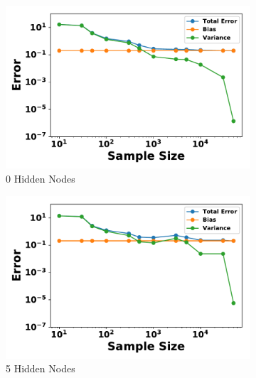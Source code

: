 \documentclass[letterpaper]{article} %
\begin{document}
        \begin{figure}[p]
          \centering
          \begin{subfigure}[b]{0.245\textwidth}
              \centering
              \includegraphics[width=\textwidth]{./RBM_Error_vs_Samples_HiddenNodes0-eps-converted-to.pdf}
              \caption{0 Hidden Nodes}
          \end{subfigure}
          \begin{subfigure}[b]{0.245\textwidth}
              \centering
              \includegraphics[width=\textwidth]{./RBM_Error_vs_Samples_HiddenNodes5-eps-converted-to.pdf}
              \caption{5 Hidden Nodes}
          \end{subfigure}
          \begin{subfigure}[b]{0.245\textwidth}
              \centering

\end{subfigure}
\end{figure}
\end{document}
